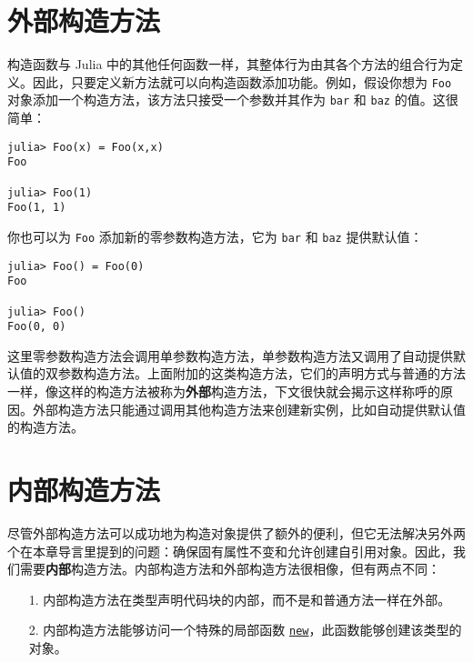 \hypertarget{8095711241800911617}{}


\section{外部构造方法}



构造函数与 Julia 中的其他任何函数一样，其整体行为由其各个方法的组合行为定义。因此，只要定义新方法就可以向构造函数添加功能。例如，假设你想为 \texttt{Foo} 对象添加一个构造方法，该方法只接受一个参数并其作为 \texttt{bar} 和 \texttt{baz} 的值。这很简单：




\begin{verbatim}
julia> Foo(x) = Foo(x,x)
Foo

julia> Foo(1)
Foo(1, 1)
\end{verbatim}



你也可以为 \texttt{Foo} 添加新的零参数构造方法，它为 \texttt{bar} 和 \texttt{baz} 提供默认值：




\begin{verbatim}
julia> Foo() = Foo(0)
Foo

julia> Foo()
Foo(0, 0)
\end{verbatim}



这里零参数构造方法会调用单参数构造方法，单参数构造方法又调用了自动提供默认值的双参数构造方法。上面附加的这类构造方法，它们的声明方式与普通的方法一样，像这样的构造方法被称为\textbf{外部}构造方法，下文很快就会揭示这样称呼的原因。外部构造方法只能通过调用其他构造方法来创建新实例，比如自动提供默认值的构造方法。



\hypertarget{3020780065533340945}{}


\section{内部构造方法}



尽管外部构造方法可以成功地为构造对象提供了额外的便利，但它无法解决另外两个在本章导言里提到的问题：确保固有属性不变和允许创建自引用对象。因此，我们需要\textbf{内部}构造方法。内部构造方法和外部构造方法很相像，但有两点不同：



\begin{itemize}
\item[1. ] 内部构造方法在类型声明代码块的内部，而不是和普通方法一样在外部。


\item[2. ] 内部构造方法能够访问一个特殊的局部函数 \hyperlink{13888762393600028594}{\texttt{new}}，此函数能够创建该类型的对象。

\end{itemize}


